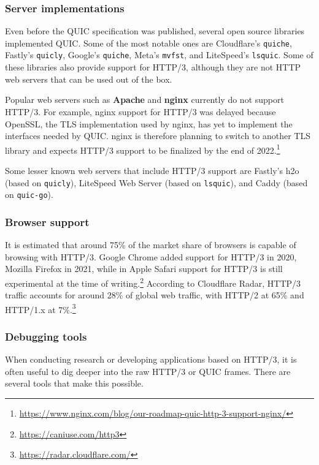 \subsubsection{Server implementations}
\label{sec:bg/http3/servers}

Even before the QUIC specification was published, several open source libraries implemented QUIC. Some of the most notable ones are Cloudflare's \texttt{quiche}, Fastly's \texttt{quicly}, Google's \texttt{quiche}, Meta's \texttt{mvfst}, and LiteSpeed's \texttt{lsquic}.\cite{quicdiversity} Some of these libraries also provide support for HTTP/3, although they are not HTTP web servers that can be used out of the box.

Popular web servers such as \textbf{Apache} and \textbf{nginx} currently do not support HTTP/3. For example, nginx support for HTTP/3 was delayed because OpenSSL, the TLS implementation used by nginx, has yet to implement the interfaces needed by QUIC. nginx is therefore planning to switch to another TLS library and expects HTTP/3 support to be finalized by the end of 2022.\footnote{\url{https://www.nginx.com/blog/our-roadmap-quic-http-3-support-nginx/}}

Some lesser known web servers that include HTTP/3 support are Fastly's h2o (based on \texttt{quicly}), LiteSpeed Web Server (based on \texttt{lsquic}), and Caddy (based on \texttt{quic-go}).

\subsubsection{Browser support}
\label{sec:bg/http3/browsers}

It is estimated that around 75\% of the market share of browsers is capable of browsing with HTTP/3. Google Chrome added support for HTTP/3 in 2020, Mozilla Firefox in 2021, while in Apple Safari support for HTTP/3 is still experimental at the time of writing.\footnote{\url{https://caniuse.com/http3}} According to Cloudflare Radar, HTTP/3 traffic accounts for around 28\% of global web traffic, with HTTP/2 at 65\% and HTTP/1.x at 7\%.\footnote{\url{https://radar.cloudflare.com/}}

\subsubsection{Debugging tools}
\label{sec:bg/http3/tools}

When conducting research or developing applications based on HTTP/3, it is often useful to dig deeper into the raw HTTP/3 or QUIC frames. There are several tools that make this possible.

